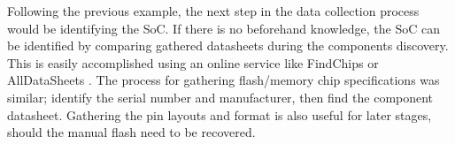 Following the previous example, the next step in the data collection process would be identifying the SoC. If there is no beforehand knowledge, the SoC can be identified by comparing gathered datasheets during the components discovery. This is easily accomplished using an online service like FindChips or AllDataSheets \autocite{FindchipsElectronicPart}. The process for gathering flash/memory chip specifications was similar; identify the serial number and manufacturer, then find the component datasheet. Gathering the pin layouts and format is also useful for later stages, should the manual flash need to be recovered.













